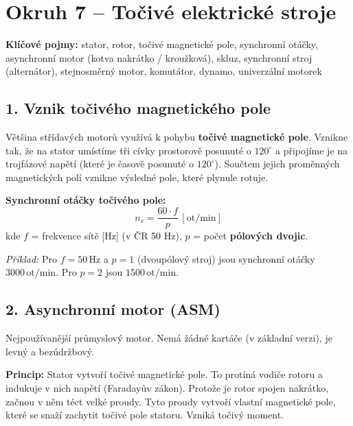 \documentclass[a4paper,10pt]{article}
\newcommand{\jednotka}[1]{\,[\mathrm{#1}]}
\begin{document}
\section*{\large Okruh 7 – Točivé elektrické stroje}

\begin{pojmybox}
\textbf{Klíčové pojmy:}
stator, rotor, točivé magnetické pole, synchronní otáčky, asynchronní motor (kotva nakrátko / kroužková), skluz, synchronní stroj (alternátor), stejnosměrný motor, komutátor, dynamo, univerzální motorek
\end{pojmybox}

\begin{vysvetlenibox}

\subsection*{1. Vznik točivého magnetického pole}

Většina střídavých motorů využívá k pohybu \textbf{točivé magnetické pole}. Vznikne tak, že na stator umístíme tři cívky prostorově posunuté o $120^\circ$ a připojíme je na trojfázové napětí (které je časově posunuté o $120^\circ$). Součtem jejich proměnných magnetických polí vznikne výsledné pole, které plynule rotuje.

\begin{vzorcebox}
\textbf{Synchronní otáčky točivého pole:}
\[
n_s = \frac{60 \cdot f}{p} \jednotka{ot/min}
\]
kde $f$ = frekvence sítě [Hz] (v ČR 50 Hz), $p$ = počet \textbf{pólových dvojic}.
\end{vzorcebox}
\textit{Příklad:} Pro $f = 50\,\mathrm{Hz}$ a $p = 1$ (dvoupólový stroj) jsou synchronní otáčky $3000\,\mathrm{ot/min}$. Pro $p = 2$ jsou $1500\,\mathrm{ot/min}$.

\subsection*{2. Asynchronní motor (ASM)}

Nejpoužívanější průmyslový motor. Nemá žádné kartáče (v základní verzi), je levný a bezúdržbový.

\textbf{Princip:} Stator vytvoří točivé magnetické pole. To protíná vodiče rotoru a indukuje v nich napětí (Faradayův zákon). Protože je rotor spojen nakrátko, začnou v něm téct velké proudy. Tyto proudy vytvoří vlastní magnetické pole, které se snaží zachytit točivé pole statoru. Vzniká točivý moment.


\end{vysvetlenibox}
\end{document}
